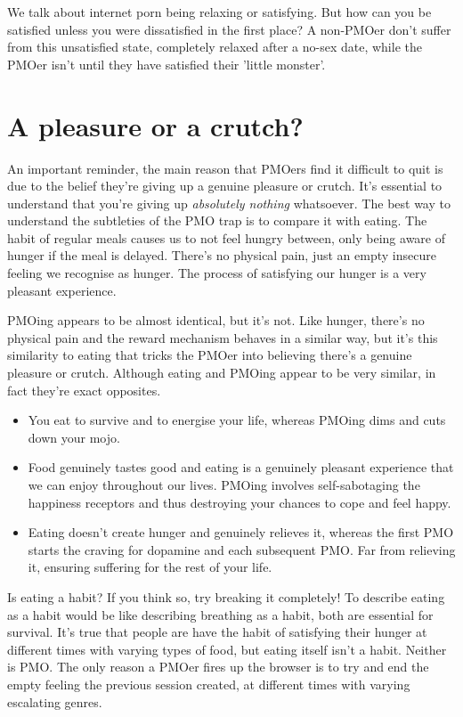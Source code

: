 \documentclass[easypeasy.tex]{subfiles}
\begin{document}
We talk about internet porn being relaxing or satisfying. But how can you be satisfied unless you were dissatisfied in the first place? A non-PMOer don't suffer from this unsatisfied state, completely relaxed after a no-sex date, while the PMOer isn't until they have satisfied their 'little monster'.

\section{A pleasure or a crutch?}
An important reminder, the main reason that PMOers find it difficult to quit is due to the belief they're giving up a genuine pleasure or crutch. It's essential to understand that you're giving up \textit{absolutely nothing} whatsoever. The best way to understand the subtleties of the PMO trap is to compare it with eating. The habit of regular meals causes us to not feel hungry between, only being aware of hunger if the meal is delayed. There's no physical pain, just an empty insecure feeling we recognise as hunger. The process of satisfying our hunger is a very pleasant experience.

PMOing appears to be almost identical, but it's not. Like hunger, there's no physical pain and the reward mechanism behaves in a similar way, but it's this similarity to eating that tricks the PMOer into believing there's a genuine pleasure or crutch. Although eating and PMOing appear to be very similar, in fact they're exact opposites.

\begin{itemize}
  \item You eat to survive and to energise your life, whereas PMOing dims and cuts down your mojo.
  \item Food genuinely tastes good and eating is a genuinely pleasant experience that we can enjoy throughout our lives. PMOing involves self-sabotaging the happiness receptors and thus destroying your chances to cope and feel happy.
  \item Eating doesn't create hunger and genuinely relieves it, whereas the first PMO starts the craving for dopamine and each subsequent PMO. Far from relieving it, ensuring suffering for the rest of your life.
  \end{itemize}

Is eating a habit? If you think so, try breaking it completely! To describe eating as a habit would be like describing breathing as a habit, both are essential for survival. It's true that people are have the habit of satisfying their hunger at different times with varying types of food, but eating itself isn't a habit. Neither is PMO. The only reason a PMOer fires up the browser is to try and end the empty feeling the previous session created, at different times with varying escalating genres.
\end{document}
